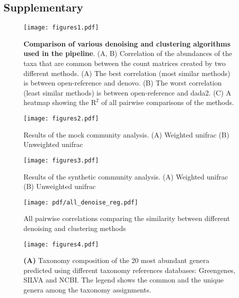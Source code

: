 \FloatBarrier

\subsection*{Supplementary}%

\setcounter{figure}{0}
\renewcommand{\thefigure}{S\arabic{figure}}

\begin{figure}[h]
  \centering
  \texttt{[image: figures1.pdf]}
  \caption{
    \textbf{Comparison of various denoising and clustering algorithms used in the pipeline}.
    (A, B) Correlation of the abundances of the taxa that are common between the count matrices created by two different methods.
    (A) The best correlation (most similar methods) is between open-reference and denovo.
    (B) The worst correlation (least similar methods) is between open-reference and dada2.
    (C) A heatmap showing the $\mathrm{R}^2$ of all pairwise comparisons of the methods.
  }
  \label{fig:figures1}
\end{figure}



\begin{figure}[h]
  \centering
  \texttt{[image: figures2.pdf]}
  \caption{Results of the mock community analysis. (A) Weighted unifrac (B) Unweighted unifrac}
  \label{fig:figures2}
\end{figure}

\begin{figure}[h]
  \centering
  \texttt{[image: figures3.pdf]}
  \caption{Results of the synthetic community analysis. (A) Weighted unifrac (B) Unweighted unifrac}
  \label{fig:figures3}
\end{figure}

\begin{figure}[h]
  \centering
  \texttt{[image: pdf/all\_denoise\_reg.pdf]}
  \caption{All pairwise correlations comparing the similarity between different denoising and clustering methods}
  \label{fig:figures4}
\end{figure}

\begin{figure}[h]
  \centering
  \texttt{[image: figures4.pdf]}
  \caption{
    \textbf{(A)} Taxonomy composition of the 20 most abundant genera predicted using different taxonomy references databases: Greengenes, SILVA and NCBI.
    The legend shows the common and the unique genera among the taxonomy assignments.
}
  \label{fig:figures4}
\end{figure}

